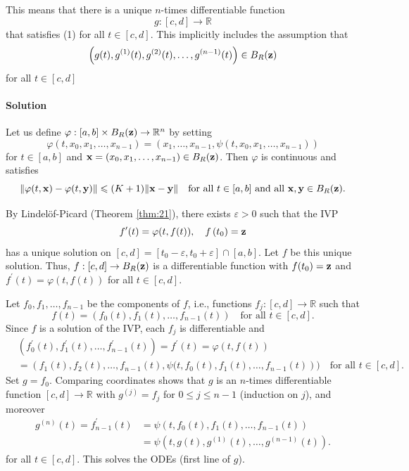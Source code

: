 \documentclass[a4paper,11pt]{article}
\begin{document}
\begin{note}
    This means that there is a unique $n$-times differentiable function
    \[
    g:[c, d] \rightarrow \mathbb{R}
    \]
    that satisfies (1) for all $t \in[c, d]$. This implicitly includes the assumption that
    \[
    \left(g(t), g^{(1)}(t), g^{(2)}(t), \ldots, g^{(n-1)}(t)\right) \in B_R({\bf z})
    \]
    for all $t \in[c, d]$
\end{note}
\paragraph{Solution} Let us define $\varphi:[a, b] \times B_R({\bf z}) \rightarrow \mathbb{R}^n$ by setting
\[
\varphi\left(t, x_0, x_1, \ldots, x_{n-1}\right)=\left(x_1, \ldots, x_{n-1}, \psi\left(t, x_0, x_1, \ldots, x_{n-1}\right)\right)
\]
for $t \in[a, b]$ and ${\bf x}=\left(x_0, x_1, \ldots, x_{n-1}\right) \in B_R({\bf z})$. Then $\varphi$ is continuous and satisfies 
\[
    \|\varphi(t, {\bf x})-\varphi(t, {\bf y})\| \leqslant(K+1)\|{\bf x}-{\bf y}\| \quad \text{for all } t \in[a, b] \text{ and all } {\bf x}, {\bf y} \in B_R({\bf z}).
\]

By Lindelöf-Picard (Theorem \ref{thm:21}), there exists $\varepsilon>0$ such that the IVP
\[
    f^{\prime}(t)=\varphi(t, f(t)), \quad f\left(t_0\right)={\bf z}
\]
has a unique solution on $[c, d]=\left[t_0-\varepsilon, t_0+\varepsilon\right] \cap[a, b]$. Let $f$ be this unique solution. 
Thus, $f:[c, d] \rightarrow B_R({\bf z})$ is a differentiable function with $f(t_0)={\bf z}$ and $f^{\prime}(t)=\varphi(t, f(t))$ for all $t \in[c, d]$. 

Let $f_0, f_1, \ldots, f_{n-1}$ be the components of $f$, i.e., functions $f_j:[c, d] \rightarrow \mathbb{R}$ such that
\[
    f(t)=\left(f_0(t), f_1(t), \ldots, f_{n-1}(t)\right) \quad \text{for all } t \in[c, d].
\]
Since $f$ is a solution of the IVP, each $f_j$ is differentiable and
\begin{align*}
    &\left(f_0^{\prime}(t), f_1^{\prime}(t), \ldots, f_{n-1}^{\prime}(t)\right)=f^{\prime}(t)=\varphi(t, f(t)) \\
    &=\left(f_1(t), f_2(t), \ldots, f_{n-1}(t), \psi(t, f_0(t), f_1(t), \ldots, f_{n-1}(t)\right))\quad \text{for all }t\in [c,d].
\end{align*}
Set $g=f_0$. Comparing coordinates shows that $g$ is an $n$-times differentiable function $[c, d] \rightarrow \mathbb{R}$ with $g^{(j)}=f_j$ for $0 \leqslant j\le n-1$ (induction on $j$), and moreover
\begin{align*}
    g^{(n)}(t)=f_{n-1}^{\prime}(t)&=\psi\left(t, f_0(t), f_1(t), \ldots, f_{n-1}(t)\right) \\
&=\psi\left(t, g(t), g^{(1)}(t), \ldots, g^{(n-1)}(t)\right).
\end{align*}
for all $t \in[c, d]$. This solves the ODEs (first line of $g$).
\end{document}
